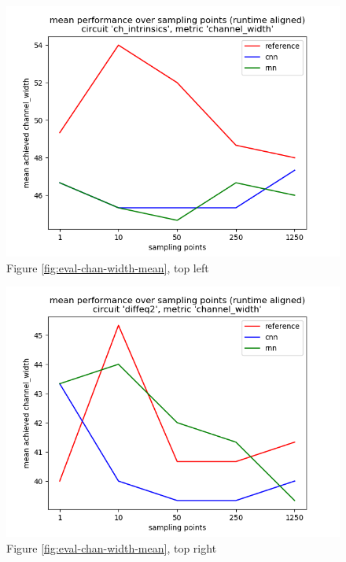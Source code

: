 \begin{figure}[H]
	\includegraphics[width=\linewidth]{plots/eval-ch_intrinsics-chan-width-mean-full.png}
	\caption{Figure \ref{fig:eval-chan-width-mean}, top left}
\end{figure}

\begin{figure}[H]
	\includegraphics[width=\linewidth]{plots/eval-diffeq2-chan-width-mean-full.png}
	\caption{Figure \ref{fig:eval-chan-width-mean}, top right}
\end{figure}

